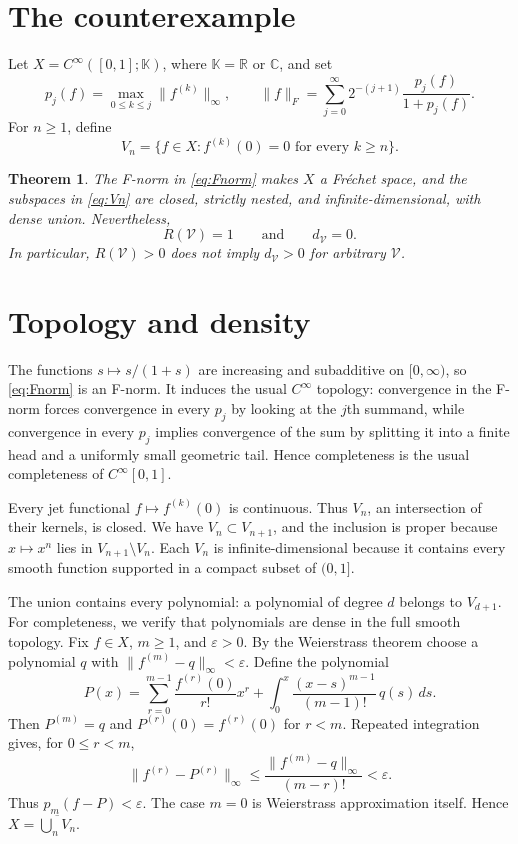 \documentclass[11pt]{article}
\newtheorem{theorem}{Theorem}
\newcommand{\R}{\mathbb R}
\newcommand{\C}{\mathbb C}
\newcommand{\V}{\mathcal V}
\begin{document}
\section{The counterexample}

Let $X=C^\infty([0,1];\mathbb K)$, where $\mathbb K=\R$ or $\C$, and set
\[
 p_j(f)=\max_{0\leq k\leq j}\|f^{(k)}\|_\infty,
 \qquad
 \|f\|_F=\sum_{j=0}^{\infty}2^{-(j+1)}
          \frac{p_j(f)}{1+p_j(f)}.
 \tag{1}\label{eq:Fnorm}
\]
For $n\geq1$, define
\[
 V_n=\{f\in X:f^{(k)}(0)=0\text{ for every }k\geq n\}.
 \tag{2}\label{eq:Vn}
\]

\begin{theorem}\label{thm:main}
The F-norm in \eqref{eq:Fnorm} makes $X$ a Fr\'echet space, and the subspaces
in \eqref{eq:Vn} are closed, strictly nested, and infinite-dimensional, with
dense union. Nevertheless,
\[
 R(\V)=1\qquad\text{and}\qquad d_{\V}=0.
\]
In particular, $R(\V)>0$ does not imply $d_{\V}>0$ for arbitrary $\V$.
\end{theorem}

\section{Topology and density}

The functions $s\mapsto s/(1+s)$ are increasing and subadditive on
$[0,\infty)$, so \eqref{eq:Fnorm} is an F-norm. It induces the usual
$C^\infty$ topology: convergence in the F-norm forces convergence in every
$p_j$ by looking at the $j$th summand, while convergence in every $p_j$
implies convergence of the sum by splitting it into a finite head and a
uniformly small geometric tail. Hence completeness is the usual completeness
of $C^\infty[0,1]$.

Every jet functional $f\mapsto f^{(k)}(0)$ is continuous. Thus $V_n$, an
intersection of their kernels, is closed. We have $V_n\subset V_{n+1}$, and
the inclusion is proper because $x\mapsto x^n$ lies in $V_{n+1}\setminus
V_n$. Each $V_n$ is infinite-dimensional because it contains every smooth
function supported in a compact subset of $(0,1]$.

The union contains every polynomial: a polynomial of degree $d$ belongs to
$V_{d+1}$. For completeness, we verify that polynomials are dense in the full
smooth topology. Fix $f\in X$, $m\geq1$, and $\varepsilon>0$. By the
Weierstrass theorem choose a polynomial $q$ with
$\|f^{(m)}-q\|_\infty<\varepsilon$. Define the polynomial
\[
 P(x)=\sum_{r=0}^{m-1}\frac{f^{(r)}(0)}{r!}x^r
 +\int_0^x\frac{(x-s)^{m-1}}{(m-1)!}\,q(s)\,ds.
\]
Then $P^{(m)}=q$ and $P^{(r)}(0)=f^{(r)}(0)$ for $r<m$. Repeated integration
gives, for $0\leq r<m$,
\[
 \|f^{(r)}-P^{(r)}\|_\infty
 \leq\frac{\|f^{(m)}-q\|_\infty}{(m-r)!}<\varepsilon.
\]
Thus $p_m(f-P)<\varepsilon$. The case $m=0$ is Weierstrass approximation
itself. Hence $X=\overline{\bigcup_nV_n}$.
\end{document}

